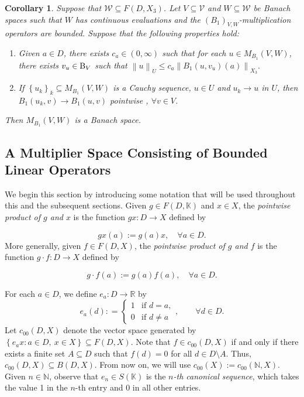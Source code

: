 \documentclass[14pt, a4paper]{article}  %
\providecommand{\llave}[1]{\left\lbrace #1\right\rbrace }
\providecommand{\pare}[1]{\left( #1\right) }
\providecommand{\norm}[1]{\left\lVert#1\right\rVert}
\newcommand{\tien}{\rightarrow}
\newcommand{\R}{\mathbb{R}}
\newcommand{\K}{\mathbb{K}}
\newcommand{\N}{\mathbb{N}}
\newcommand{\B}{\textup{B}}
\newcommand{\V}{\mathcal{V}}
\newcommand{\W}{\mathcal{W}}
\newtheorem{corollary}{Corollary}[section]
\begin{document}
\begin{corollary}\label{lola56_2}
	Suppose that $\W\subseteq F\pare{D,X_{3}}$. Let  $V\subseteq \V$ and  $W\subseteq \W$ be Banach spaces such that $W$ has continuous evaluations and the   $\pare{B_{1}}_{V,W}$-multiplication operators are bounded. Suppose that the following properties hold:
	\begin{enumerate}
		\item[i.]  Given  $a\in D$, there exists $c_{a}\in (0,\infty)$ such that for each $u\in M_{B_{1}}\pare{V,W}$, there exists $v_{u}\in \B_{V}$  such that $\norm{u}_{U}\leq c_{a} \norm{B_{1}\pare{u,v_{u}}\pare{a}}_{X_{3}}.$
		\item[ii.] If  $\llave{u_{k}}_{k}\subseteq M_{B_{1}}\pare{V,W}$ is a Cauchy sequence, $u\in U$ and  $u_{k}\tien u$ in $U$, then  $B_{1}\pare{u_{k},v} \tien B_{1}\pare{u,v}$ pointwise , $\forall v\in V$.
	\end{enumerate}  
	Then    $M_{B_{1}}\pare{V,W}$ is a Banach space. 
\end{corollary}  	

 


  \subsection{A Multiplier Space Consisting of Bounded Linear Operators}\label{lalo3}
  
	 We begin this section by introducing some notation that will be used throughout this and the subsequent sections. Given $g \in F\pare{D, \K}$ and $x \in X$, the \emph{pointwise product of $g$ and $x$} is the function $gx: D \tien X$ defined by
 	
 	\begin{equation}
 			gx\pare{a} := g\pare{a} x, \quad \forall a \in D.
 	\end{equation} More generally, given  $f \in F\pare{D, X}$, the \emph{pointwise product of $g$ and $f$} is the function $g \cdot f: D \tien X$ defined by
 	
 \begin{equation}
 		g \cdot f\pare{a} := g\pare{a} f\pare{a}, \quad \forall a \in D.
 \end{equation}

	For each $a \in D$, we define $e_a : D \to \R$ by
	\begin{equation}
	e_{a}\pare{d}: = \left \{ \begin{matrix} 1 & \mbox{if }d=a,
	\\ 0 & \mbox{if }d\neq a\end{matrix}\right., \qquad \forall d\in D.
	\end{equation}
	Let $c_{00}(D, X)$ denote the vector space generated by $\llave{e_{a}x: a\in D,\ x\in X}\subseteq F\pare{D,X}$. Note that $f \in c_{00}(D, X)$ if and only if there exists a finite set $A \subseteq D$ such that $f(d) = 0$ for all $d \in D \setminus A$. Thus, $c_{00}(D, X) \subseteq B(D, X)$. From now on, we will use $c_{00}(X) := c_{00}(\N, X)$.   Given $n \in \mathbb{N}$, observe that $e_{n} \in S\pare{\K}$ is the \emph{$n$-th canonical sequence}, which takes the value 1 in the $n$-th entry and 0 in all other entries.
	
\end{document}
